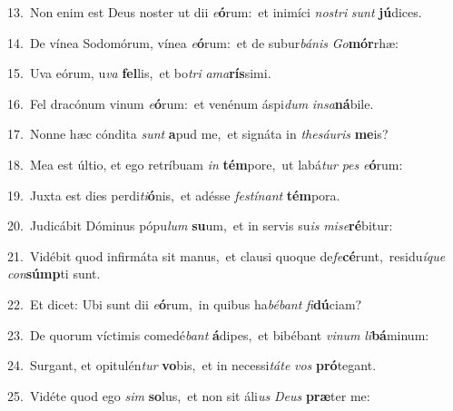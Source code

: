 {\numbfont\textcolor{\numbcolor}{13.}}~Non enim est Deus noster ut dii \textit{e}\-\textbf{ó}rum:~\star et inimíci \textit{nos}\-\textit{tri} \textit{sunt} \textbf{jú}\-dices.\par
{\numbfont\textcolor{\numbcolor}{14.}}~De vínea Sodomórum, vínea \textit{e}\-\textbf{ó}rum:~\star et de subur\-\textit{bá}\-\textit{nis} \textit{Go}\-\textbf{mór}rhæ:\par
{\numbfont\textcolor{\numbcolor}{15.}}~Uva eórum, u\textit{va} \textbf{fel}\-lis,~\star et bo\textit{tri} \textit{a}\-\textit{ma}\textbf{rís}simi.\par
{\numbfont\textcolor{\numbcolor}{16.}}~Fel dracónum vinum \textit{e}\-\textbf{ó}rum:~\star et venénum áspi\textit{dum} \textit{in}\-\textit{sa}\textbf{ná}bile.\par
{\numbfont\textcolor{\numbcolor}{17.}}~Nonne hæc cóndita \textit{sunt} \textbf{a}\-pud me,~\star et signáta in \textit{the}\-\textit{sáu}\textit{ris} \textbf{me}\-is?\par
{\numbfont\textcolor{\numbcolor}{18.}}~Mea est últio, et ego retríbuam \textit{in} \textbf{tém}\-pore,~\star ut labá\textit{tur} \textit{pes} \textit{e}\-\textbf{ó}rum:\par
{\numbfont\textcolor{\numbcolor}{19.}}~Juxta est dies perdi\-\textit{ti}\-\textbf{ó}nis,~\star et adésse \textit{fes}\-\textit{tí}\textit{nant} \textbf{tém}\-pora.\par
{\numbfont\textcolor{\numbcolor}{20.}}~Judicábit Dóminus pópu\textit{lum} \textbf{su}\-um,~\star et in servis su\textit{is} \textit{mi}\-\textit{se}\textbf{ré}bitur:\par
{\numbfont\textcolor{\numbcolor}{21.}}~Vidébit quod infirmáta sit manus,~\dagger et clausi quoque de\-\textit{fe}\-\textbf{cé}runt,~\star residu\-\textit{í}\-\textit{que} \textit{con}\-\textbf{súmp}ti sunt.\par
{\numbfont\textcolor{\numbcolor}{22.}}~Et dicet: Ubi sunt dii \textit{e}\-\textbf{ó}rum,~\star in quibus ha\-\textit{bé}\-\textit{bant} \textit{fi}\-\textbf{dú}ciam?\par
{\numbfont\textcolor{\numbcolor}{23.}}~De quorum víctimis comedé\textit{bant} \textbf{á}\-dipes,~\star et bibébant \textit{vi}\-\textit{num} \textit{li}\-\textbf{bá}minum:\par
{\numbfont\textcolor{\numbcolor}{24.}}~Surgant, et opitulén\textit{tur} \textbf{vo}\-bis,~\star et in necessi\-\textit{tá}\-\textit{te} \textit{vos} \textbf{pró}\-tegant.\par
{\numbfont\textcolor{\numbcolor}{25.}}~Vidéte quod ego \textit{sim} \textbf{so}\-lus,~\star et non sit áli\textit{us} \textit{De}\-\textit{us} \textbf{præ}\-ter me:\par
